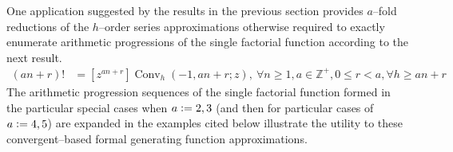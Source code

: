 \documentclass[12pt,reqno]{article}
\numberwithin{sfootnote}{section}
\numberwithin{equation}{section}
\theoremstyle{plain}
\theoremstyle{definition}
\theoremstyle{remark}
\newcommand{\defequals}{\ensuremath{\vcentcolon=}}
\newcommand{\ConvGF}[4]{\ensuremath{\Conv_{#1}\left(#2, #3; #4\right)}}
\DeclareMathOperator{\Conv}{Conv}
\begin{document}
One application suggested by the results in the previous section 
provides $a$--fold reductions of the 
$h$--order series approximations otherwise required to 
exactly enumerate 
arithmetic progressions of the single factorial function according to the 
next result. 
\begin{align} 
\label{eqn_AKPlusB_FactFn_Conv_Ident-stmt_v1} 
\left(an+r\right)! & = 
     [z^{an+r}] \ConvGF{h}{-1}{an+r}{z},\ 
     \forall n \geq 1, a \in \mathbb{Z}^{+}, 0 \leq r < a, 
     \forall h \geq an+r 
\end{align} 
The arithmetic progression sequences of the single factorial function 
formed in the 
particular special cases when $a \defequals 2, 3$ 
(and then for particular cases of $a \defequals 4,5$) 
are expanded in the 
examples cited below illustrate the utility to these convergent--based 
formal generating function approximations. 
\end{document}
